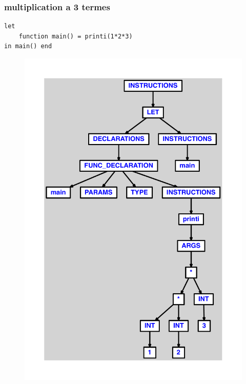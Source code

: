 \documentclass{article}
\begin{document}
\subsubsection{multiplication a 3 termes}
\begin{lstlisting}
let
	function main() = printi(1*2*3)
in main() end
\end{lstlisting}
\newpage
\begin{figure}[H]
\centering
\includegraphics[max width=\textwidth]{ast/ast_49.pdf}
\end{figure}
\newpage
\end{document}
